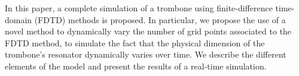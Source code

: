 In this paper, a complete simulation of a trombone using finite-difference time-domain (FDTD) methods is proposed. In particular, we propose the use of a novel method to dynamically vary the number of grid points associated to the FDTD method, to simulate the fact that the physical dimension of the trombone's resonator dynamically varies over time.
We describe the different elements of the model and present the results of a real-time simulation.